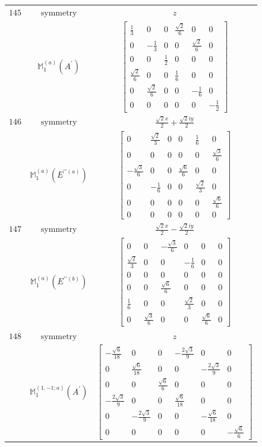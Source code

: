 \documentclass[fleqn,8pt,landscape]{jsarticle}
\begin{document}
\begin{longtable}{ccc}
$ 145 $ & $ \text{symmetry} $ & $ z $ \\
$  $ & $ \mathbb{M}_{1}^{(a)}(A^{\prime}) $ & $ \begin{bmatrix} \frac{1}{3} & 0 & 0 & \frac{\sqrt{2}}{6} & 0 & 0 \\ 0 & - \frac{1}{3} & 0 & 0 & \frac{\sqrt{2}}{6} & 0 \\ 0 & 0 & \frac{1}{2} & 0 & 0 & 0 \\ \frac{\sqrt{2}}{6} & 0 & 0 & \frac{1}{6} & 0 & 0 \\ 0 & \frac{\sqrt{2}}{6} & 0 & 0 & - \frac{1}{6} & 0 \\ 0 & 0 & 0 & 0 & 0 & - \frac{1}{2} \end{bmatrix} $ \\ \hline
$ 146 $ & $ \text{symmetry} $ & $ \frac{\sqrt{2} x}{2} + \frac{\sqrt{2} i y}{2} $ \\
$  $ & $ \mathbb{M}_{1}^{(a)}(E^{\prime\prime(a)}) $ & $ \begin{bmatrix} 0 & \frac{\sqrt{2}}{3} & 0 & 0 & \frac{1}{6} & 0 \\ 0 & 0 & 0 & 0 & 0 & \frac{\sqrt{3}}{6} \\ - \frac{\sqrt{3}}{6} & 0 & 0 & \frac{\sqrt{6}}{6} & 0 & 0 \\ 0 & - \frac{1}{6} & 0 & 0 & \frac{\sqrt{2}}{3} & 0 \\ 0 & 0 & 0 & 0 & 0 & \frac{\sqrt{6}}{6} \\ 0 & 0 & 0 & 0 & 0 & 0 \end{bmatrix} $ \\ \hline
$ 147 $ & $ \text{symmetry} $ & $ \frac{\sqrt{2} x}{2} - \frac{\sqrt{2} i y}{2} $ \\
$  $ & $ \mathbb{M}_{1}^{(a)}(E^{\prime\prime(b)}) $ & $ \begin{bmatrix} 0 & 0 & - \frac{\sqrt{3}}{6} & 0 & 0 & 0 \\ \frac{\sqrt{2}}{3} & 0 & 0 & - \frac{1}{6} & 0 & 0 \\ 0 & 0 & 0 & 0 & 0 & 0 \\ 0 & 0 & \frac{\sqrt{6}}{6} & 0 & 0 & 0 \\ \frac{1}{6} & 0 & 0 & \frac{\sqrt{2}}{3} & 0 & 0 \\ 0 & \frac{\sqrt{3}}{6} & 0 & 0 & \frac{\sqrt{6}}{6} & 0 \end{bmatrix} $ \\ \hline
$ 148 $ & $ \text{symmetry} $ & $ z $ \\
$  $ & $ \mathbb{M}_{1}^{(1,-1;a)}(A^{\prime}) $ & $ \begin{bmatrix} - \frac{\sqrt{6}}{18} & 0 & 0 & - \frac{2 \sqrt{3}}{9} & 0 & 0 \\ 0 & \frac{\sqrt{6}}{18} & 0 & 0 & - \frac{2 \sqrt{3}}{9} & 0 \\ 0 & 0 & \frac{\sqrt{6}}{6} & 0 & 0 & 0 \\ - \frac{2 \sqrt{3}}{9} & 0 & 0 & \frac{\sqrt{6}}{18} & 0 & 0 \\ 0 & - \frac{2 \sqrt{3}}{9} & 0 & 0 & - \frac{\sqrt{6}}{18} & 0 \\ 0 & 0 & 0 & 0 & 0 & - \frac{\sqrt{6}}{6} \end{bmatrix} $ \\ \hline

\end{longtable}
\end{document}
